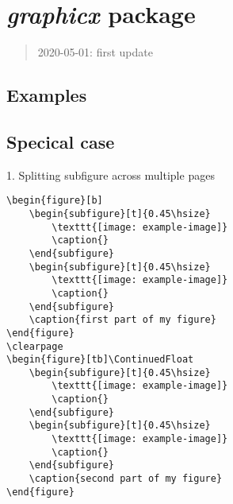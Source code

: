 \section{\textit{graphicx} package}

\begin{quote}
    2020-05-01: first update
\end{quote}




\subsection{Examples}

\subsection{Specical case}

1. Splitting subfigure across multiple pages

\begin{lstlisting}[language=Tex]
\begin{figure}[b]
    \begin{subfigure}[t]{0.45\hsize}
        \texttt{[image: example-image]}
        \caption{}
    \end{subfigure}   
    \begin{subfigure}[t]{0.45\hsize}
        \texttt{[image: example-image]}
        \caption{}
    \end{subfigure}
    \caption{first part of my figure}
\end{figure}
\clearpage   
\begin{figure}[tb]\ContinuedFloat
    \begin{subfigure}[t]{0.45\hsize}
        \texttt{[image: example-image]}
        \caption{}
    \end{subfigure}
    \begin{subfigure}[t]{0.45\hsize}
        \texttt{[image: example-image]}
        \caption{}
    \end{subfigure}
    \caption{second part of my figure}
\end{figure}
\end{lstlisting}

